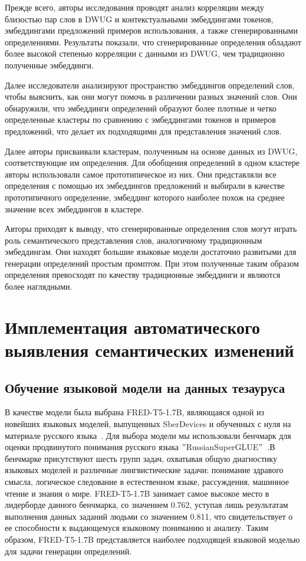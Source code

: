 \documentclass[LI,VKR]{HSEUniversity}
\begin{document}
Прежде всего, авторы исследования проводят анализ корреляции между близостью пар слов в DWUG
и контекстуальными эмбеддингами токенов, эмбеддингами предложений примеров использования, а также
сгенерированными определениями.
Результаты показали, что сгенерированные определения обладают более высокой степенью
корреляции с данными из DWUG, чем традиционно полученные эмбеддинги.

Далее исследователи анализируют пространство эмбеддингов определений слов,
чтобы выяснить, как они могут помочь в различении разных значений слов.
Они обнаружили, что эмбеддинги определений образуют более плотные и четко определенные
кластеры по сравнению с эмбеддингами токенов и примеров предложений, что делает их
подходящими для представления значений слов.

Далее авторы присваивали кластерам, полученным на основе данных из DWUG,
соответствующие им определения.
Для обобщения определений в одном кластере авторы использовали самое прототипическое из них.
Они представляли все определения с помощью их эмбеддингов предложений и выбирали в качестве
прототипичного определение, эмбеддинг которого наиболее похож на среднее значение всех
эмбеддингов в кластере.

Авторы приходят к выводу, что сгенерированные определения слов могут играть роль
семантического представления слов, аналогичному традиционным эмбеддингам.
Они находят большие языковые модели достаточно развитыми для генерации определений
простым промптом.
При этом полученные таким образом определения превосходят по качеству
традиционные эмбеддинги и являются более наглядными.

\chapter{Имплементация автоматического выявления семантических изменений}

\section{Обучение языковой модели на данных тезауруса}

В качестве модели была выбрана FRED-T5-1.7B, являющаяся одной из новейших языковых моделей,
выпущенных SberDevices и обученных с нуля на материале русского языка~\cite{FRED-T5}.
Для выбора модели мы использовали бенчмарк для оценки продвинутого понимания русского языка
\("\)RussianSuperGLUE\("\)~\cite{RussianSuperGLUE}.В бенчмарке присутствуют шесть групп задач, охватывая
общую диагностику языковых моделей и различные лингвистические задачи: понимание здравого смысла, логическое
следование в естественном языке, рассуждения, машинное чтение и знания о мире.
FRED-T5-1.7B занимает самое высокое место в лидерборде данного бенчмарка, со значением 0.762,
уступая лишь результатам выполнения данных заданий людьми со значением 0.811,
что свидетельствует о ее способности к выдающемуся языковому пониманию и анализу.
Таким образом, FRED-T5-1.7B представляется наиболее подходящей языковой моделью
для задачи генерации определений.
\end{document}
